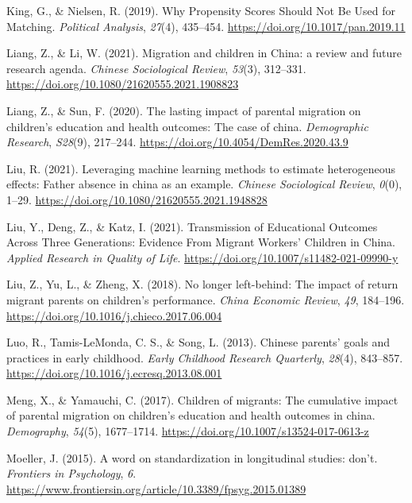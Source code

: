 \documentclass[
  man,floatsintext]{apa7}
\newlength{\cslhangindent}
\newlength{\cslentryspacingunit} %
\newenvironment{CSLReferences}[2] %
 {%
  \setlength{\parindent}{0pt}
  \ifodd #1
  \let\oldpar\par
  \def\par{\hangindent=\cslhangindent\oldpar}
  \fi
  \setlength{\parskip}{#2\cslentryspacingunit}
 }%
 {}
\begin{document}
\begin{CSLReferences}{1}{0}
\leavevmode{}%
King, G., \& Nielsen, R. (2019). Why Propensity Scores Should Not Be Used for Matching. \emph{Political Analysis}, \emph{27}(4), 435--454. \url{https://doi.org/10.1017/pan.2019.11}

\leavevmode{}%
Liang, Z., \& Li, W. (2021). Migration and children in China: a review and future research agenda. \emph{Chinese Sociological Review}, \emph{53}(3), 312--331. \url{https://doi.org/10.1080/21620555.2021.1908823}

\leavevmode{}%
Liang, Z., \& Sun, F. (2020). The lasting impact of parental migration on children's education and health outcomes: The case of china. \emph{Demographic Research}, \emph{S28}(9), 217--244. \url{https://doi.org/10.4054/DemRes.2020.43.9}

\leavevmode{}%
Liu, R. (2021). Leveraging machine learning methods to estimate heterogeneous effects: Father absence in china as an example. \emph{Chinese Sociological Review}, \emph{0}(0), 1--29. \url{https://doi.org/10.1080/21620555.2021.1948828}

\leavevmode{}%
Liu, Y., Deng, Z., \& Katz, I. (2021). Transmission of Educational Outcomes Across Three Generations: Evidence From Migrant Workers{'} Children in China. \emph{Applied Research in Quality of Life}. \url{https://doi.org/10.1007/s11482-021-09990-y}

\leavevmode{}%
Liu, Z., Yu, L., \& Zheng, X. (2018). No longer left-behind: The impact of return migrant parents on children's performance. \emph{China Economic Review}, \emph{49}, 184--196. \url{https://doi.org/10.1016/j.chieco.2017.06.004}

\leavevmode{}%
Luo, R., Tamis-LeMonda, C. S., \& Song, L. (2013). Chinese parents{'} goals and practices in early childhood. \emph{Early Childhood Research Quarterly}, \emph{28}(4), 843--857. \url{https://doi.org/10.1016/j.ecresq.2013.08.001}

\leavevmode{}%
Meng, X., \& Yamauchi, C. (2017). Children of migrants: The cumulative impact of parental migration on children{'}s education and health outcomes in china. \emph{Demography}, \emph{54}(5), 1677--1714. \url{https://doi.org/10.1007/s13524-017-0613-z}

\leavevmode{}%
Moeller, J. (2015). A word on standardization in longitudinal studies: don't. \emph{Frontiers in Psychology}, \emph{6}. \url{https://www.frontiersin.org/article/10.3389/fpsyg.2015.01389}


\end{CSLReferences}
\end{document}
